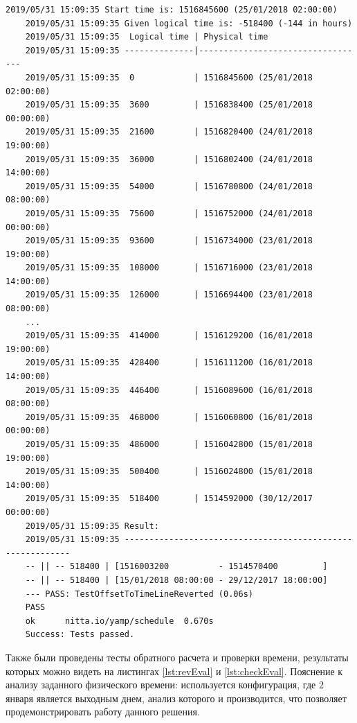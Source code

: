 \begin{lstlisting}[caption={Пример обратного расчета модулем},label={lst:revEval}]
	2019/05/31 15:09:35 Start time is: 1516845600 (25/01/2018 02:00:00)
	2019/05/31 15:09:35 Given logical time is: -518400 (-144 in hours)
	2019/05/31 15:09:35  Logical time | Physical time
	2019/05/31 15:09:35 --------------|----------------------------------
	2019/05/31 15:09:35  0            | 1516845600 (25/01/2018 02:00:00)
	2019/05/31 15:09:35  3600         | 1516838400 (25/01/2018 00:00:00)
	2019/05/31 15:09:35  21600        | 1516820400 (24/01/2018 19:00:00)
	2019/05/31 15:09:35  36000        | 1516802400 (24/01/2018 14:00:00)
	2019/05/31 15:09:35  54000        | 1516780800 (24/01/2018 08:00:00)
	2019/05/31 15:09:35  75600        | 1516752000 (24/01/2018 00:00:00)
	2019/05/31 15:09:35  93600        | 1516734000 (23/01/2018 19:00:00)
	2019/05/31 15:09:35  108000       | 1516716000 (23/01/2018 14:00:00)
	2019/05/31 15:09:35  126000       | 1516694400 (23/01/2018 08:00:00)
	...
	2019/05/31 15:09:35  414000       | 1516129200 (16/01/2018 19:00:00)
	2019/05/31 15:09:35  428400       | 1516111200 (16/01/2018 14:00:00)
	2019/05/31 15:09:35  446400       | 1516089600 (16/01/2018 08:00:00)
	2019/05/31 15:09:35  468000       | 1516060800 (16/01/2018 00:00:00)
	2019/05/31 15:09:35  486000       | 1516042800 (15/01/2018 19:00:00)
	2019/05/31 15:09:35  500400       | 1516024800 (15/01/2018 14:00:00)
	2019/05/31 15:09:35  518400       | 1514592000 (30/12/2017 00:00:00)
	2019/05/31 15:09:35 Result:
	2019/05/31 15:09:35 -----------------------------------------------------------
	-- || -- 518400 | [1516003200          - 1514570400         ]
	-- || -- 518400 | [15/01/2018 08:00:00 - 29/12/2017 18:00:00]
	--- PASS: TestOffsetToTimeLineReverted (0.06s)
	PASS
	ok  	nitta.io/yamp/schedule	0.670s
	Success: Tests passed.
\end{lstlisting}

\indent Также были проведены тесты обратного расчета и проверки времени, результаты которых можно видеть на листингах \ref{lst:revEval} и \ref{lst:checkEval}.
Пояснение к анализу заданного физического времени: используется конфигурация, где 2 января является выходным днем, анализ которого и производится, что позволяет продемонстрировать работу данного решения.

